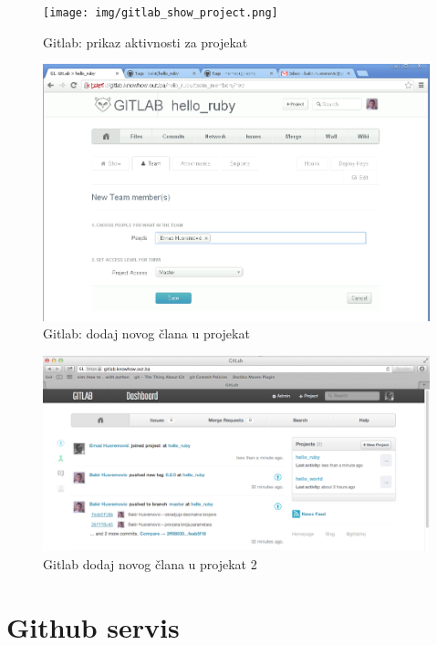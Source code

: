 \documentclass[times, utf8, seminar]{fit}
\begin{document}
\begin{figure}[H]
\centering
\texttt{[image: img/gitlab\_show\_project.png]}
\caption{Gitlab: prikaz aktivnosti za projekat}
\end{figure}



\begin{figure}[H]
\centering
\includegraphics[width=15cm]{img/gitlab_add_new_member_to_project.png}
\caption{Gitlab: dodaj novog člana u projekat}
\end{figure}

\begin{figure}[H]
\centering
\includegraphics[width=15cm]{img/gitlab_add_new_member_to_project_2.png}
\caption{Gitlab dodaj novog člana u projekat 2}
\end{figure}




\section{Github servis}
\end{document}
